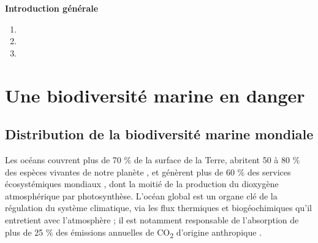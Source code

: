 
\centerline{\bfseries\textcolor{bleusection}{ \Huge Introduction générale}}  

\bigskip



{\LARGE
\begin{enumerate}[label=\textcolor{bleusection}{\arabic*}{.}, leftmargin=2cm]
  \item {}
  \item {}
  \item {}
\end{enumerate}
}

\clearpage
\pagestyle{intro}


\section{Une biodiversité marine en danger}\label{intro.1}

\subsection{Distribution de la biodiversité marine mondiale}\label{intro.1.1}

Les océans couvrent plus de 70 \% de la surface de la Terre, abritent 50 à 80 \% des espèces vivantes de notre planète \citep{mora_how_2011, costello_global_2013}, et génèrent plus de 60 \% des services écosystémiques mondiaux \citep{millenium_ecosystem_assessment_ecosystem_2005, bindoff_changing_2019, ipbes_global_2019}, dont la moitié de la production du dioxygène atmosphérique par photosynthèse. L’océan global est un organe clé de la régulation du système climatique, via les flux thermiques et biogéochimiques qu’il entretient avec l’atmosphère ; il est notamment responsable de l’absorption de plus de 25 \% des émissions annuelles de CO\textsubscript{2} d’origine anthropique \citep{heinze_ocean_2015}.

